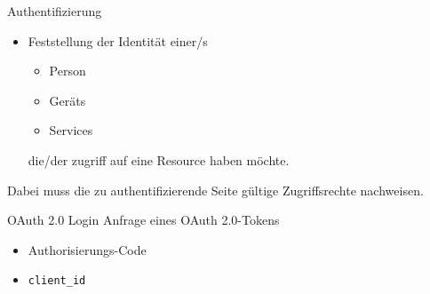 

\begin{flashcard}[Definition]{Authentifizierung}
    \begin{itemize}
        \item Feststellung der Identität einer/s
        \begin{itemize}
            \item Person
            \item Geräts
            \item Services
        \end{itemize}
        die/der zugriff auf eine Resource haben möchte.
    \end{itemize}

    Dabei muss die zu authentifizierende Seite gültige Zugriffsrechte nachweisen.
\end{flashcard}



\begin{flashcard}[Definition]{OAuth 2.0 Login}
    Anfrage eines OAuth 2.0-Tokens
    \begin{itemize}
        \item Authorisierungs-Code
        \item \texttt{client\_id}
    \end{itemize}
\end{flashcard}

